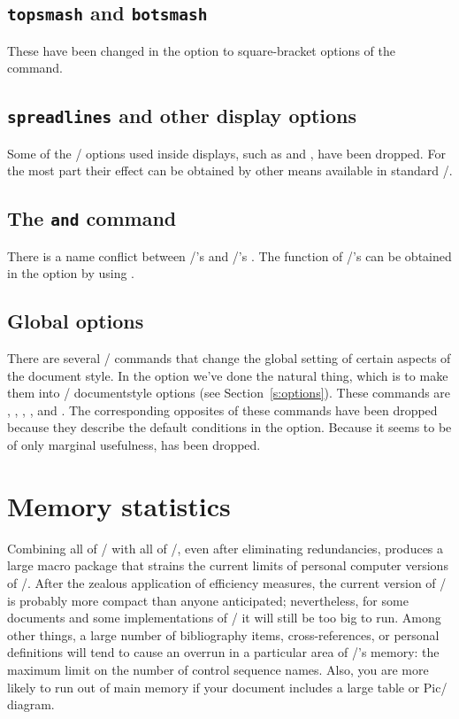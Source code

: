 \subsection{{\tt\bslash topsmash} and {\tt\bslash botsmash}}
These have been changed in the  option to square-bracket
options of the  command.

\subsection{{\tt\bslash spreadlines} and other display options}

Some of the \amstex/ options used inside displays, 
such as  and , have been dropped.  For the
most part their effect can be obtained by other means available in
standard \latex/.

\subsection{The {\tt\bslash and} command}
There is a name conflict between \amstex/'s  and
\latex/'s .  The function of \amstex/'s 
can be obtained in the  option by using
.

\subsection{Global options}
There are several \amstex/ commands that change the global setting of
certain aspects of the document style.  In the  option we've
done the natural thing, which is to make them into \latex/
documentstyle options (see Section~\ref{s:options}).  These commands are
, , ,
, and .  The corresponding
opposites of these commands have been dropped because they
describe the default conditions in the  option.
Because it seems to be of only marginal usefulness,
 has been dropped.

\section{Memory statistics}
\label{memstats}

Combining all of \amstex/ with all of \latex/, even after eliminating
redundancies, produces a large macro package that strains the current
limits of personal computer versions of \tex/\@.  After the
zealous application of efficiency measures, the current version of
\amslatex/ is probably more compact than anyone anticipated;
nevertheless, for some documents and some implementations of \tex/
it will still be too big to run.  Among other things, a
large number of bibliography items, cross-references, or personal
definitions will tend to cause an overrun in a particular area of
\tex/'s memory: the maximum limit on the number of control sequence
names.   Also, you are more likely to run out of main memory if your
document includes a large table or Pic\tex/ diagram.

